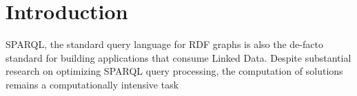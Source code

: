 \section{Introduction}
SPARQL, the standard query language for RDF graphs is also the de-facto standard for building applications that consume Linked Data. 
Despite substantial research on optimizing SPARQL query processing, the computation of solutions remains a computationally intensive task
